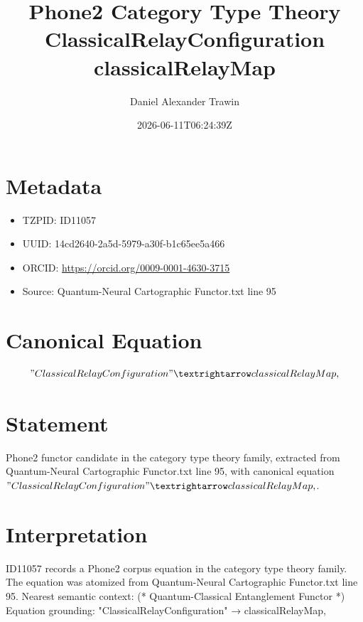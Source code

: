 \documentclass[11pt]{article}
\title{Phone2 Category Type Theory ClassicalRelayConfiguration classicalRelayMap}
\author{Daniel Alexander Trawin}
\date{2026-06-11T06:24:39Z}
\begin{document}
\maketitle
\section*{Metadata}
\begin{itemize}
\item TZPID: ID11057
\item UUID: 14cd2640-2a5d-5979-a30f-b1c65ee5a466
\item ORCID: \url{https://orcid.org/0009-0001-4630-3715}
\item Source: Quantum-Neural Cartographic Functor.txt line 95
\end{itemize}
\section*{Canonical Equation}
\[
"ClassicalRelayConfiguration" → classicalRelayMap,
\]
\section*{Statement}
Phone2 functor candidate in the category type theory family, extracted from Quantum-Neural Cartographic Functor.txt line 95, with canonical equation $"ClassicalRelayConfiguration" → classicalRelayMap,$.
\section*{Interpretation}
ID11057 records a Phone2 corpus equation in the category type theory family. The equation was atomized from Quantum-Neural Cartographic Functor.txt line 95. Nearest semantic context: (* Quantum-Classical Entanglement Functor *) Equation grounding: "ClassicalRelayConfiguration" → classicalRelayMap,
\end{document}
